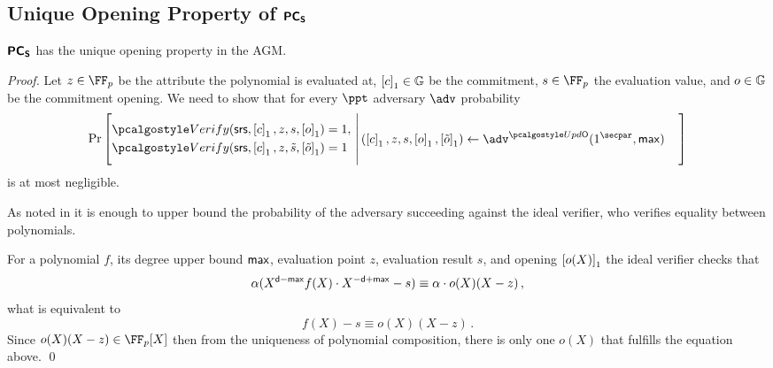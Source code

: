 \subsection{Unique Opening Property of $\bm{\mathsf{PC}}_{\bm{\mathsf{S}}}$}
\begin{lemma}
\label{lem:pcoms_unique_op}
$\bm{\mathsf{PC}}_{\bm{\mathsf{S}}}$ has the unique opening property in the AGM. 
\end{lemma}
\begin{proof}
Let 
$z \in \FF_p$ be the attribute the polynomial is evaluated at,
$\left[c\right]_{1} \in \mathbb{G}$ be the commitment,  
$s \in \FF_p$ the evaluation value, and 
$o \in \mathbb{G}$ be the commitment opening. 
We need to show that for every $\ppt$ adversary $\adv$ probability
\[
  \Pr \left[
    \begin{aligned}
      & \verify(\srs, \gone{c}, z, s, \gone{o}) = 1, \\
      & \verify(\srs, \gone{c}, z, \tilde{s}, \gone{\tilde{o}}) = 1
    \end{aligned}
    \,\left|\, \vphantom{\begin{aligned}
          & \verify(\srs, \gone{c}, z, s, \gone{o}),\\
          & \verify(\srs, \gone{c}, z, s, \gone{\tilde{o}}) \\
          &o \neq \tilde{o})
		\end{aligned}}
      \begin{aligned}
        & (\gone{c}, z, s, \gone{o}, \gone{\tilde{o}}) \gets \adv^{\initU}(1^\secpar, \maxdeg)
      \end{aligned}
    \right.\right]
\]
is at most negligible.

As noted in \cite[Lemma 2.2]{EPRINT:GabWilCio19} it is enough to upper bound the
probability of the adversary succeeding against the ideal verifier, who verifies equality between polynomials.

For a polynomial $f$, its degree upper bound $\mathsf{max}$, evaluation point $z$,
evaluation result $s$, and opening $\left[o(X)\right]_{1}$ the ideal verifier checks that
\begin{equation}
  \alpha (X^{\mathsf{d} - \mathsf{max}}f(X) \cdot X^{-\mathsf{d} + \mathsf{max}} -  s) \equiv \alpha \cdot o(X) (X - z)\,,
\end{equation}
what is equivalent to 
\begin{equation}
	f(X) -  s \equiv o(X) (X - z)\,.
	\label{eq:pcoms_idealised_check}
\end{equation}
Since $o(X)(X - z) \in \FF_p[X]$ then from the uniqueness of polynomial
composition, there is only one $o(X)$ that fulfills the equation above.
\qed
\end{proof}


